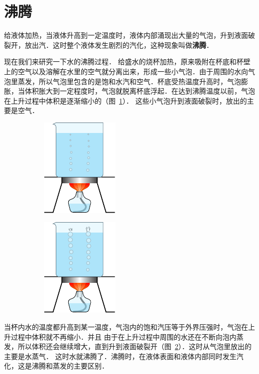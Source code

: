 \section{沸腾}
给液体加热，当液体升高到一定温度时，液体内部涌现出大量的气泡，升到液面破裂开，放出汽．这时整个液体发生剧烈的汽化，这种现象叫做\textbf{沸腾}．

现在我们来研究一下水的沸腾过程．
给盛水的烧杯加热，原来吸附在杯底和杯壁上的空气以及溶解在水里的空气就分离出来，形成一些小气泡．由于周围的水向气泡里蒸发，所以气泡里包含的是饱和水汽和空气．杯底受热温度升高时，气泡膨胀，当体积胀大到一定程度时，气泡就脱离杯底浮起．在达到沸腾温度以前，气泡在上升过程中体积是逐渐缩小的（图~\ref{fig_B_5-6a}）．
这些小气泡升到液面破裂时，放出的主要是空气．
\begin{figure}[htbp]
    \centering
    \begin{subfigure}{0.4\linewidth}
        \centering
        \includegraphics{fig/B/5-6a.pdf}
        \caption{}\label{fig_B_5-6a}
    \end{subfigure}
    \hfil
    \begin{subfigure}{0.4\linewidth}
        \centering
        \includegraphics{fig/B/5-6b.pdf}
        \caption{}\label{fig_B_5-6b}
    \end{subfigure}
    \caption{}\label{fig_B_5-6}
\end{figure}

当杯内水的温度都升高到某一温度，气泡内的饱和汽压等于外界压强时，气泡在上升过程中体积就不再缩小．并且
由于在上升过程中周围的水还在不断向泡内蒸发，所以体积还会继续增大，直到升到液面破裂开（图~\ref{fig_B_5-6b}）．这时从气泡里放出的主要是水蒸气．
这时水就沸腾了．沸腾时，在液体表面和液体内部同时发生汽化，这是沸腾和蒸发的主要区别．

